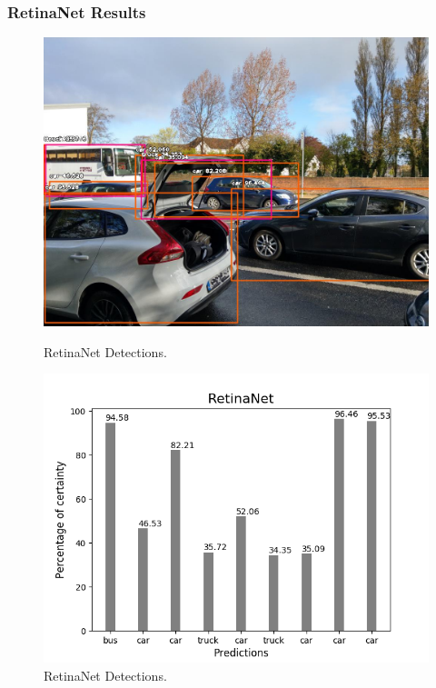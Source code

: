     \subsubsection{RetinaNet Results}

    \begin{figure}[htb]
        \centering
        \begin{minipage}[b]{0.44\textwidth}
          \includegraphics[width=\textwidth]{Sections/4InitialWork/4_images_obj_run1/retinaNet.jpg}
          \caption{RetinaNet Detections.}
        \end{minipage}
        \hfill
        \begin{minipage}[b]{0.50\textwidth}
          \includegraphics[width=\textwidth]{Sections/4InitialWork/4_images_obj_run1/retinaNet_graph.png}
          \caption{RetinaNet Detections.}
        \end{minipage}
      \end{figure}
    
